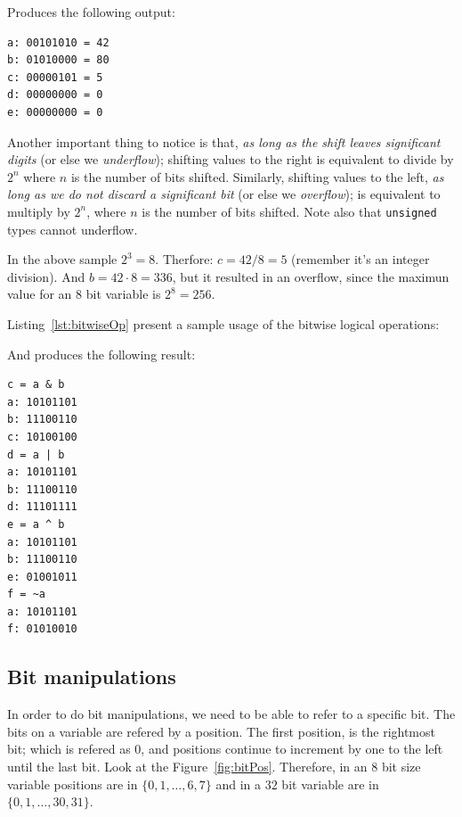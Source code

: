 
Produces the following output:

\begin{verbatim}
a: 00101010 = 42
b: 01010000 = 80
c: 00000101 = 5
d: 00000000 = 0
e: 00000000 = 0
\end{verbatim} 

Another important thing to notice is that, \emph{as long as the shift leaves significant digits} (or else we \emph{underflow}); shifting values to the right is equivalent to divide by $2^n$ where $n$ is the number of bits shifted.
Similarly, shifting values to the left, \emph{as long as we do not discard a significant bit} (or else we \emph{overflow}); is equivalent to multiply by $2^n$, where $n$ is the number of bits shifted.
Note also that \texttt{unsigned} types cannot underflow.

In the above sample $2^3 = 8$.
Therfore: $c = 42 / 8 = 5$ (remember it's an integer division).
And $b = 42 \cdot 8 = 336$, but it resulted in an overflow, since the maximun value for an $8$ bit variable is $2^8 = 256$.

Listing~\ref{lst:bitwiseOp} present a sample usage of the bitwise logical operations:


And produces the following result:

\begin{verbatim}
c = a & b
a: 10101101
b: 11100110
c: 10100100
d = a | b
a: 10101101
b: 11100110
d: 11101111
e = a ^ b
a: 10101101
b: 11100110
e: 01001011
f = ~a
a: 10101101
f: 01010010
\end{verbatim}

\subsection{Bit manipulations}

In order to do bit manipulations, we need to be able to refer to a specific bit.
The bits on a variable are refered by a position.
The first position, is the rightmost bit; which is refered as $0$, and positions continue to increment by one to the left until the last bit.
Look at the Figure~\ref{fig:bitPos}.
Therefore, in an $8$ bit size variable positions are in $\{ 0, 1, \ldots, 6, 7 \}$ and in a $32$ bit variable are in $\{ 0, 1, \ldots, 30, 31 \}$.

